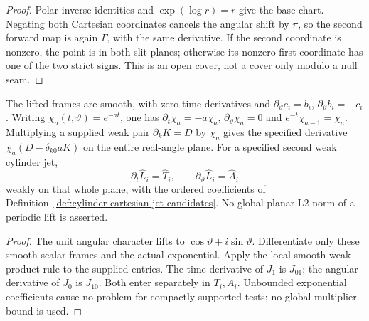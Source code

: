 \begin{proof}
\leanok
Polar inverse identities and $\exp(\log r)=r$ give the base chart.
Negating both Cartesian coordinates cancels the angular shift by $\pi$,
so the second forward map is again $\Gamma$, with the same derivative.
If the second coordinate is nonzero, the point is in both slit planes;
otherwise its nonzero first coordinate has one of the two strict signs.
This is an open cover, not a cover only modulo a null seam.
\end{proof}

\begin{lemma}
\label{lem:cylinder-cartesian-source-calculus}
\leanok
The lifted frames are smooth, with zero time derivatives and
$\partial_\vartheta c_i=b_i$, $\partial_\vartheta b_i=-c_i$.
Writing $\chi_a(t,\vartheta)=e^{-at}$, one has
$\partial_t\chi_a=-a\chi_a$, $\partial_\vartheta\chi_a=0$ and
$e^{-t}\chi_{a-1}=\chi_a$.
Multiplying a supplied weak pair $\partial_kK=D$ by $\chi_a$ gives the
specified derivative $\chi_a(D-\delta_{k0}aK)$ on the entire real-angle plane.
For a specified second weak cylinder jet,
\[
 \partial_t\widehat L_i=\widehat T_i,\qquad
 \partial_\vartheta\widehat L_i=\widehat A_i
\]
weakly on that whole plane, with the ordered coefficients of
Definition~\ref{def:cylinder-cartesian-jet-candidates}.
No global planar L2 norm of a periodic lift is asserted.
\end{lemma}

\begin{proof}
\leanok
The unit angular character lifts to $\cos\vartheta+i\sin\vartheta$.
Differentiate only these smooth scalar frames and the actual exponential.
Apply the local smooth weak product rule to the supplied entries.
The time derivative of $J_1$ is $J_{01}$; the angular derivative of $J_0$
is $J_{10}$. Both enter separately in $T_i,A_i$.
Unbounded exponential coefficients cause no problem for compactly supported
tests; no global multiplier bound is used.
\end{proof}

